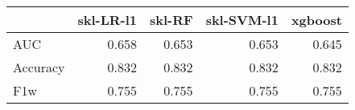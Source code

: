 \begin{tabular}{lrrrr}
\toprule
{} &  skl-LR-l1 &  skl-RF &  skl-SVM-l1 &  xgboost \\
\midrule
AUC      &      0.658 &   0.653 &       0.653 &    0.645 \\
Accuracy &      0.832 &   0.832 &       0.832 &    0.832 \\
F1w      &      0.755 &   0.755 &       0.755 &    0.755 \\
\bottomrule
\end{tabular}
